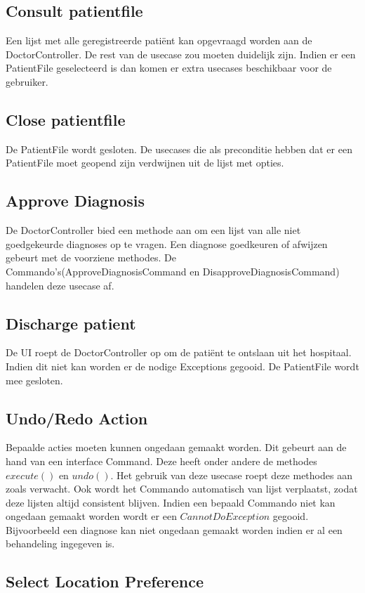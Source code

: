 \subsection{Consult patientfile}
Een lijst met alle geregistreerde patiënt kan opgevraagd worden aan de DoctorController. De rest van de usecase zou moeten duidelijk zijn.
Indien er een PatientFile geselecteerd is dan komen er extra usecases beschikbaar voor de gebruiker.

\subsection{Close patientfile}
De PatientFile wordt gesloten. De usecases die als preconditie hebben dat er een PatientFile moet geopend zijn verdwijnen uit de lijst met opties.

\subsection{Approve Diagnosis}
De DoctorController bied een methode aan om een lijst van alle niet goedgekeurde diagnoses op te vragen. 
Een diagnose goedkeuren of afwijzen gebeurt met de voorziene methodes. 
De Commando's(ApproveDiagnosisCommand en DisapproveDiagnosisCommand) handelen deze usecase af. 

\subsection{Discharge patient}
De UI roept de DoctorController op om de patiënt te ontslaan uit het hospitaal. Indien dit niet kan worden er de nodige Exceptions gegooid.
De PatientFile wordt mee gesloten.

\subsection{Undo/Redo Action}
Bepaalde acties moeten kunnen ongedaan gemaakt worden. Dit gebeurt aan de hand van een interface Command. 
Deze heeft onder andere de methodes $execute()$ en $undo()$. 
Het gebruik van deze usecase roept deze methodes aan zoals verwacht. 
Ook wordt het Commando automatisch van lijst verplaatst, zodat deze lijsten altijd consistent blijven.
Indien een bepaald Commando niet kan ongedaan gemaakt worden wordt er een $CannotDoException$ gegooid. 
Bijvoorbeeld een diagnose kan niet ongedaan gemaakt worden indien er al een behandeling ingegeven is.

\subsection{Select Location Preference}


